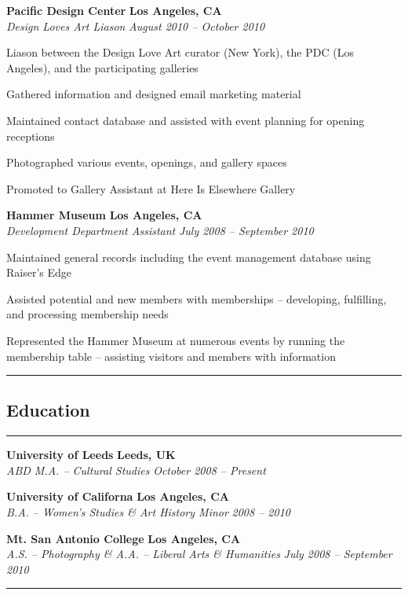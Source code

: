 \documentclass[10pt,letterpaper]{article}			%
\newcommand{\JobHeader}[4]{							%
			\textbf{#1}
			\hfill
			\textbf{#2}
			\\
			\emph{#3}
			\hfill
			\emph{#4}\par 
			\vspace{-.8em}
			}
\newcommand{\InternHeader}[4]{							%
			\textbf{#1}
			\hfill
			\textbf{#2}
			\\
			\emph{#3}
			\hfill
			\emph{#4}\par 
			}
\begin{document}
			\vspace{-.6em}
	\JobHeader{Pacific Design Center}{Los Angeles, CA}{Design Loves Art Liason}{August 2010 -- October 2010}
			\begin{itemize*}
			\item Liason between the Design Love Art curator (New York), the PDC (Los Angeles), and the participating galleries
			\item Gathered information and designed email marketing material
			\item Maintained contact database and assisted with event planning for opening receptions
			\item Photographed various events, openings, and gallery spaces
			\item Promoted to Gallery Assistant at Here Is Elsewhere Gallery
			\end{itemize*}
			\vspace{-.6em}
	\JobHeader{Hammer Museum}{Los Angeles, CA}{Development Department Assistant}{July 2008 -- September 2010}
			\begin{itemize*}	
			\item Maintained general records including the event management database using Raiser's Edge
			\item Assisted potential and new members with memberships -- developing, fulfilling, and processing membership needs
			\item Represented the Hammer Museum at numerous events by running the membership table -- assisting visitors and members with information
			\end{itemize*}
			\vspace{-.4em}		
\hrule
\vspace{-1.4em}
\subsection*{Education}
\vspace{-.4em}
\hrule
\vspace{.4em}
	
	\InternHeader{University of Leeds}{Leeds, UK}{ABD M.A. -- Cultural Studies}{October 2008 -- Present}
	\InternHeader{University of Californa}{Los Angeles, CA}{B.A. -- Women's Studies \& Art History Minor}{2008 -- 2010}
	\InternHeader{Mt. San Antonio College}{Los Angeles, CA}{A.S. -- Photography \& A.A. -- Liberal Arts \& Humanities}{July 2008 -- September 2010}

\vspace{.4em}
\hrule
\vspace{-1.4em}
\end{document}
